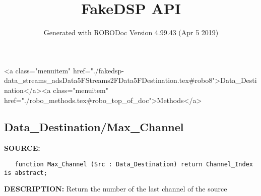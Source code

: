 \documentclass{article}
\title{FakeDSP API}
\author{Generated with ROBODoc Version 4.99.43 (Apr  5 2019)
}
\begin{document}
\maketitle
\printindex
\tableofcontents
\newpage

<a class="menuitem" href="./fakedsp-data_streams_adsData5FStreams2FData5FDestination.tex#robo8">Data_Destination</a><a class="menuitem" href="./robo_methods.tex#robo_top_of_doc">Methods</a>\subsection{Data\_Destination/Max\_Channel}
\textbf{SOURCE:}\hspace{0.08in}\begin{verbatim}
   function Max_Channel (Src : Data_Destination) return Channel_Index is abstract;
\end{verbatim}
\textbf{DESCRIPTION:}\hspace{0.08in}
   Return the number of the last channel of the source
\end{document}
